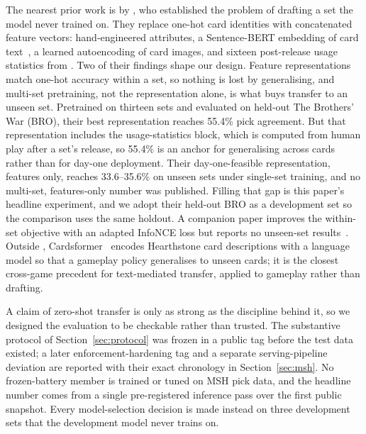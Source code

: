 The nearest prior work is by \citet{bertram2024cards}, who established the
problem of drafting a set the model never trained on. They replace one-hot
card identities with concatenated feature vectors: hand-engineered
attributes, a Sentence-BERT embedding of card
text~\citep{reimers2019sbert}, a learned autoencoding of card images, and
sixteen post-release usage statistics from \seventeenlands{}. Two of their
findings shape our design. Feature representations match one-hot accuracy
within a set, so nothing is lost by generalising, and multi-set
pretraining, not the representation alone, is what buys transfer to an
unseen set. Pretrained on thirteen sets and evaluated on held-out The
Brothers' War (BRO), their best representation reaches 55.4\% pick
agreement. But that representation includes the usage-statistics block,
which is computed from human play after a set's release, so 55.4\% is an
anchor for generalising across cards rather than for day-one deployment.
Their day-one-feasible representation, features only, reaches
33.6--35.6\% on unseen sets under single-set training, and no multi-set,
features-only number was published. Filling that gap is this paper's
headline experiment, and we adopt their held-out BRO as a development set
so the comparison uses the same holdout. A companion paper improves the
within-set objective with an adapted InfoNCE loss but reports no
unseen-set results~\citep{bertram2024infonce}. Outside \mtg{},
Cardsformer~\citep{xia2023cardsformer} encodes Hearthstone card
descriptions with a language model so that a gameplay policy generalises
to unseen cards; it is the closest cross-game precedent for text-mediated
transfer, applied to gameplay rather than drafting.

A claim of zero-shot transfer is only as strong as the discipline behind
it, so we designed the evaluation to be checkable rather than trusted. The
substantive protocol of Section~\ref{sec:protocol} was frozen in a public
tag before the test data existed; a later enforcement-hardening tag and a
separate serving-pipeline deviation are reported with their exact
chronology in Section~\ref{sec:msh}. No frozen-battery member is trained or
tuned on MSH pick data, and the headline number comes from a single
pre-registered inference pass over the first public snapshot. Every
model-selection decision is made instead on three development sets that
the development model never trains on.

